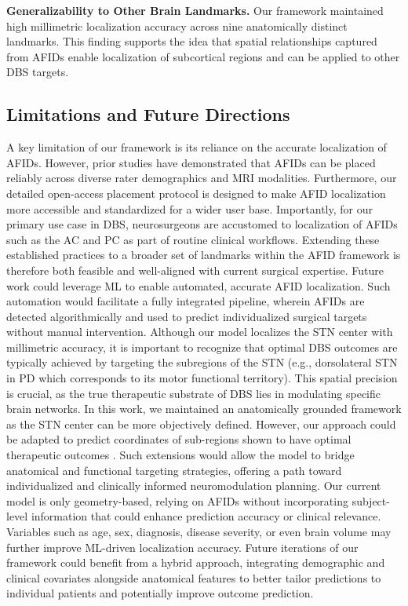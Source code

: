 \textbf{Generalizability to Other Brain Landmarks.} Our framework maintained high millimetric localization accuracy across nine anatomically distinct landmarks. This finding supports the idea that spatial relationships captured from AFIDs enable localization of subcortical regions and can be applied to other DBS targets.

\subsection{Limitations and Future Directions}
A key limitation of our framework is its reliance on the accurate localization of AFIDs. However, prior studies have demonstrated that AFIDs can be placed reliably across diverse rater demographics and MRI modalities. Furthermore, our detailed open-access placement protocol is designed to make AFID localization more accessible and standardized for a wider user base. Importantly, for our primary use case in DBS, neurosurgeons are accustomed to localization of AFIDs such as the AC and PC as part of routine clinical workflows. Extending these established practices to a broader set of landmarks within the AFID framework is therefore both feasible and well-aligned with current surgical expertise. Future work could leverage ML to enable automated, accurate AFID localization. Such automation would facilitate a fully integrated pipeline, wherein AFIDs are detected algorithmically and used to predict individualized surgical targets without manual intervention.
Although our model localizes the STN center with millimetric accuracy, it is important to recognize that optimal DBS outcomes are typically achieved by targeting the subregions of the STN (e.g., dorsolateral STN in PD which corresponds to its motor functional territory). This spatial precision is crucial, as the true therapeutic substrate of DBS lies in modulating specific brain networks. In this work, we maintained an anatomically grounded framework as the STN center can be more objectively defined. However, our approach could be adapted to predict coordinates of sub-regions shown to have optimal therapeutic outcomes \cite{Hollunder2024-wc}. Such extensions would allow the model to bridge anatomical and functional targeting strategies, offering a path toward individualized and clinically informed neuromodulation planning.
Our current model is only geometry-based, relying on AFIDs without incorporating subject-level information that could enhance prediction accuracy or clinical relevance. Variables such as age, sex, diagnosis, disease severity, or even brain volume may further improve ML-driven localization accuracy. Future iterations of our framework could benefit from a hybrid approach, integrating demographic and clinical covariates alongside anatomical features to better tailor predictions to individual patients and potentially improve outcome prediction.
